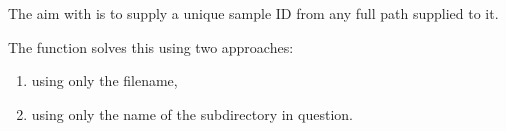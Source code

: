 The aim with  is to supply a unique sample ID from any full path supplied to it.

The function solves this using two approaches:
\begin{enumerate}
\item using only the filename,
\item using only the name of the subdirectory in question.
\end{enumerate}


